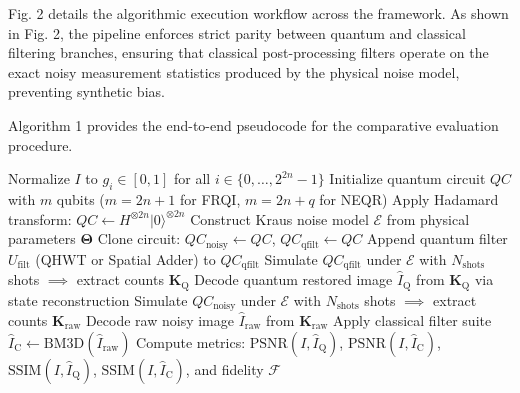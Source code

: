\documentclass[12pt,onecolumn,draftclsnofoot]{IEEEtran}
\begin{document}
Fig. 2 details the algorithmic execution workflow across the framework. As shown in Fig. 2, the pipeline enforces strict parity between quantum and classical filtering branches, ensuring that classical post-processing filters operate on the exact noisy measurement statistics produced by the physical noise model, preventing synthetic bias.

Algorithm 1 provides the end-to-end pseudocode for the comparative evaluation procedure.

\begin{algorithm}[htbp]
\caption{Comparative Quantum vs. Classical Image Denoising Evaluation}
\label{alg:framework}
Normalize $I$ to $g_i \in [0, 1]$ for all $i \in \{0, \dots, 2^{2n}-1\}$\;
Initialize quantum circuit $QC$ with $m$ qubits ($m = 2n+1$ for FRQI, $m = 2n+q$ for NEQR)\;
Apply Hadamard transform: $QC \gets H^{\otimes 2n} |0\rangle^{\otimes 2n}$\;
Construct Kraus noise model $\mathcal{E}$ from physical parameters $\mathbf{\Theta}$\;
Clone circuit: $QC_{\text{noisy}} \gets QC$, $QC_{\text{qfilt}} \gets QC$\;
Append quantum filter $U_{\text{filt}}$ (QHWT or Spatial Adder) to $QC_{\text{qfilt}}$\;
Simulate $QC_{\text{qfilt}}$ under $\mathcal{E}$ with $N_{\text{shots}}$ shots $\implies$ extract counts $\mathbf{K}_{\text{Q}}$\;
Decode quantum restored image $\hat{I}_{\text{Q}}$ from $\mathbf{K}_{\text{Q}}$ via state reconstruction\;
Simulate $QC_{\text{noisy}}$ under $\mathcal{E}$ with $N_{\text{shots}}$ shots $\implies$ extract counts $\mathbf{K}_{\text{raw}}$\;
Decode raw noisy image $\hat{I}_{\text{raw}}$ from $\mathbf{K}_{\text{raw}}$\;
Apply classical filter suite $\hat{I}_{\text{C}} \gets \text{BM3D}(\hat{I}_{\text{raw}})$\;
Compute metrics: $\text{PSNR}(I, \hat{I}_{\text{Q}})$, $\text{PSNR}(I, \hat{I}_{\text{C}})$, $\text{SSIM}(I, \hat{I}_{\text{Q}})$, $\text{SSIM}(I, \hat{I}_{\text{C}})$, and fidelity $\mathcal{F}$\;
\end{algorithm}
\end{document}
